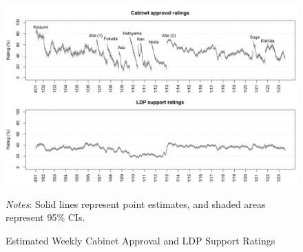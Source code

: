 \documentclass[12pt,letterpaper]{scrartcl}
\begin{document}
\begin{landscape}
\begin{figure}[t]
\begin{minipage}{\hsize}
\centering
\singlespacing
\includegraphics[scale=1]{Figure_POQ/approval_time_series.pdf}
\caption{Estimated Weekly Cabinet Approval and LDP Support Ratings}
\label{approval_time_series}
\end{minipage}
\begin{minipage}{\hsize}
\bigskip
\small
\emph{Notes}: Solid lines represent point estimates, and shaded areas represent 95\% CIs.
\end{minipage}
\end{figure}
\end{landscape}
\end{document}

